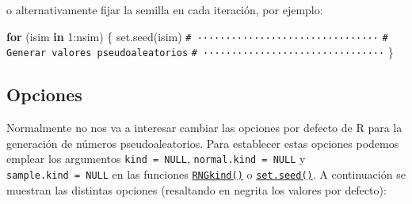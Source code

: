 \documentclass[
  10pt,
]{book}
\newenvironment{Shaded}{\begin{snugshade}}{\end{snugshade}}
\newcommand{\CommentTok}[1]{\textcolor[rgb]{0.56,0.35,0.01}{\textit{#1}}}
\newcommand{\ControlFlowTok}[1]{\textcolor[rgb]{0.13,0.29,0.53}{\textbf{#1}}}
\newcommand{\DecValTok}[1]{\textcolor[rgb]{0.00,0.00,0.81}{#1}}
\newcommand{\FunctionTok}[1]{\textcolor[rgb]{0.00,0.00,0.00}{#1}}
\newcommand{\NormalTok}[1]{#1}
\newcommand{\SpecialCharTok}[1]{\textcolor[rgb]{0.00,0.00,0.00}{#1}}
\theoremstyle{break}
\theoremstyle{nonumberplain}
\renewcommand{\CommentTok}[1]{\textcolor[rgb]{0.41,0.41,0.41}{\texttt{#1}}}
\begin{document}
o alternativamente fijar la semilla en cada iteración, por ejemplo:

\begin{Shaded}
\begin{Highlighting}[]
\ControlFlowTok{for}\NormalTok{ (isim }\ControlFlowTok{in} \DecValTok{1}\SpecialCharTok{:}\NormalTok{nsim) \{}
  \FunctionTok{set.seed}\NormalTok{(isim)}
  \CommentTok{\# ································}
  \CommentTok{\# Generar valores pseudoaleatorios}
  \CommentTok{\# ································}
\NormalTok{\}}
\end{Highlighting}
\end{Shaded}

\hypertarget{oprrng}{%
\subsection{Opciones}\label{oprrng}}

Normalmente no nos va a interesar cambiar las opciones por defecto de R para la generación de números pseudoaleatorios.
Para establecer estas opciones podemos emplear los argumentos \texttt{kind\ =\ NULL}, \texttt{normal.kind\ =\ NULL} y \texttt{sample.kind\ =\ NULL} en las funciones \href{https://rdrr.io/r/base/Random.html}{\texttt{RNGkind()}} o \href{https://rdrr.io/r/base/Random.html}{\texttt{set.seed()}}.
A continuación se muestran las distintas opciones (resaltando en negrita los valores por defecto):
\end{document}
